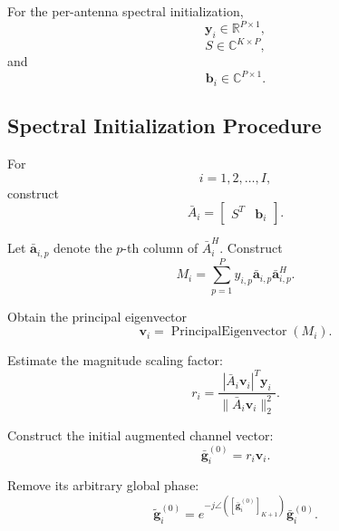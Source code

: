 \documentclass[12pt,a4paper]{article}
\begin{document}
For the per-antenna spectral initialization,
\begin{equation}
\mathbf y_i\in\mathbb{R}^{P\times1},
\tag{333}
\end{equation}
\begin{equation}
S\in\mathbb{C}^{K\times P},
\tag{334}
\end{equation}
and
\begin{equation}
\mathbf b_i\in\mathbb{C}^{P\times1}.
\tag{335}
\end{equation}

\subsection{Spectral Initialization Procedure}

For
\begin{equation}
i=1,2,\ldots,I,
\tag{336}
\end{equation}
construct
\begin{equation}
\boxed{
\bar A_i
=
\begin{bmatrix}
S^T&\mathbf b_i
\end{bmatrix}
}.
\tag{337}
\end{equation}

Let $\bar{\mathbf a}_{i,p}$ denote the $p$-th column of $\bar A_i^H$.
Construct
\begin{equation}
\boxed{
M_i
=
\sum_{p=1}^{P}
y_{i,p}
\bar{\mathbf a}_{i,p}
\bar{\mathbf a}_{i,p}^H
}.
\tag{338}
\end{equation}

Obtain the principal eigenvector
\begin{equation}
\boxed{
\mathbf v_i
=
\operatorname{PrincipalEigenvector}(M_i)
}.
\tag{339}
\end{equation}

Estimate the magnitude scaling factor:
\begin{equation}
\boxed{
r_i
=
\frac{
|\bar A_i\mathbf v_i|^T\mathbf y_i
}{
\|\bar A_i\mathbf v_i\|_2^2
}
}.
\tag{340}
\end{equation}

Construct the initial augmented channel vector:
\begin{equation}
\boxed{
\bar{\mathbf g}_i^{(0)}
=
r_i\mathbf v_i
}.
\tag{341}
\end{equation}

Remove its arbitrary global phase:
\begin{equation}
\boxed{
\widetilde{\mathbf g}_i^{(0)}
=
e^{-j\angle([\bar{\mathbf g}_i^{(0)}]_{K+1})}
\bar{\mathbf g}_i^{(0)}
}.
\tag{342}
\end{equation}
\end{document}

